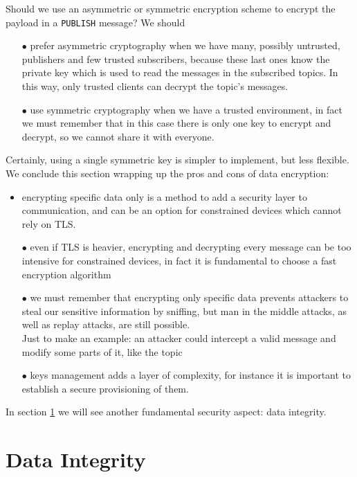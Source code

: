 \documentclass[12pt]{report}
\begin{document}
{{Should we use an asymmetric or symmetric encryption scheme to encrypt the payload in a \texttt{PUBLISH} message? We should

\begin{itemize}
\setlength{\itemindent}{+4mm}
\item[$\bullet$] prefer asymmetric cryptography when we have many, possibly untrusted, publishers and few trusted subscribers, because these last ones know the private key which is used to read the messages in the subscribed topics.
In this way, only trusted clients can decrypt the topic's messages.
\item[$\bullet$] use symmetric cryptography when we have a trusted environment, in fact we must remember that in this case there is only one key to encrypt and decrypt, so we cannot share it with everyone.
\end{itemize}
\bigskip
Certainly, using a single symmetric key is simpler to implement, but less flexible.\\

We conclude this section wrapping up the pros and cons of data encryption:

\begin{itemize}
\setlength{\itemindent}{+4mm}
\item encrypting specific data only is a method to add a security layer to communication, and can be an option for constrained devices which cannot rely on TLS.
\item[$\bullet$] even if TLS is heavier, encrypting and decrypting every message can be too intensive for constrained devices, in fact it is fundamental to choose a fast encryption algorithm
\item[$\bullet$] we must remember that encrypting only specific data prevents attackers to steal our sensitive information by sniffing, but man in the middle attacks, as well as replay attacks, are still possible.\\ 
Just to make an example: an attacker could intercept a valid message and modify some parts of it, like the topic
\item[$\bullet$] keys management adds a layer of complexity, for instance it is important to establish a secure provisioning of them.
\end{itemize}
\bigskip
In section \ref{sec:dataintegrity} we will see another fundamental security aspect: data integrity.\\

\clearpage
\section{Data Integrity}
\label{sec:dataintegrity}
\bigskip

}}
\end{document}
